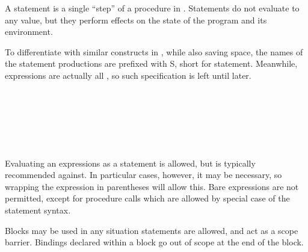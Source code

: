 A statement is a single ``step'' of a procedure in \Prose{}. Statements do not
evaluate to any value, but they perform effects on the state of the program and
its environment.

To differentiate with similar constructs in \Poetry{}, while also saving space,
the names of the statement productions are prefixed with S, short for statement.
Meanwhile, expressions are actually all \Poetry{}, so such specification is left
until later.

\begin{bnf*}
     \\
     \\
     \\
     \\
     \\
\end{bnf*}

Evaluating an expressions as a statement is allowed, but is typically
recommended against. In particular cases, however, it may be necessary,
so wrapping the expression in parentheses will allow this. Bare expressions
are not permitted, except for procedure calls which are allowed by special
case of the statement syntax.

\begin{prooftree}
\end{prooftree}

Blocks may be used in any situation statements are allowed, and act as
a scope barrier. Bindings declared within a block go out of scope at
the end of the block.

